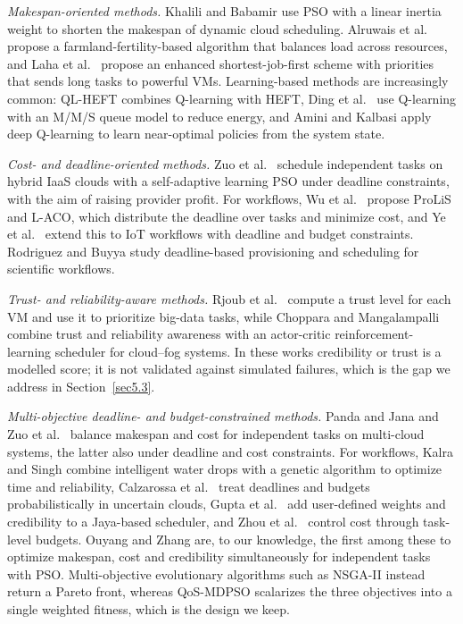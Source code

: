 \documentclass[pdflatex,sn-basic]{sn-jnl}
\theoremstyle{thmstyleone}%
\theoremstyle{thmstyletwo}%
\theoremstyle{thmstylethree}%
\begin{document}
\textit{Makespan-oriented methods.} Khalili and Babamir \citeyearpar{khalili2015} use PSO with a linear inertia weight to shorten the makespan of dynamic cloud scheduling. Alruwais et al.\ \citeyearpar{alruwais2024} propose a farmland-fertility-based algorithm that balances load across resources, and Laha et al.\ \citeyearpar{laha2024} propose an enhanced shortest-job-first scheme with priorities that sends long tasks to powerful VMs. Learning-based methods are increasingly common: QL-HEFT \citep{tong2020} combines Q-learning with HEFT, Ding et al.\ \citeyearpar{ding2020} use Q-learning with an M/M/S queue model to reduce energy, and Amini and Kalbasi \citeyearpar{amini2024} apply deep Q-learning to learn near-optimal policies from the system state.

\textit{Cost- and deadline-oriented methods.} Zuo et al.\ \citeyearpar{zuo2013} schedule independent tasks on hybrid IaaS clouds with a self-adaptive learning PSO under deadline constraints, with the aim of raising provider profit. For workflows, Wu et al.\ \citeyearpar{wu2017} propose ProLiS and L-ACO, which distribute the deadline over tasks and minimize cost, and Ye et al.\ \citeyearpar{ye2024} extend this to IoT workflows with deadline and budget constraints. Rodriguez and Buyya \citeyearpar{rodriguez2014} study deadline-based provisioning and scheduling for scientific workflows.

\textit{Trust- and reliability-aware methods.} Rjoub et al.\ \citeyearpar{rjoub2020} compute a trust level for each VM and use it to prioritize big-data tasks, while Choppara and Mangalampalli \citeyearpar{choppara2024} combine trust and reliability awareness with an actor-critic reinforcement-learning scheduler for cloud--fog systems. In these works credibility or trust is a modelled score; it is not validated against simulated failures, which is the gap we address in Section~\ref{sec5.3}.

\textit{Multi-objective deadline- and budget-constrained methods.} Panda and Jana \citeyearpar{panda2015} and Zuo et al.\ \citeyearpar{zuo2016} balance makespan and cost for independent tasks on multi-cloud systems, the latter also under deadline and cost constraints. For workflows, Kalra and Singh \citeyearpar{kalra2019} combine intelligent water drops with a genetic algorithm to optimize time and reliability, Calzarossa et al.\ \citeyearpar{calzarossa2021} treat deadlines and budgets probabilistically in uncertain clouds, Gupta et al.\ \citeyearpar{gupta2021} add user-defined weights and credibility to a Jaya-based scheduler, and Zhou et al.\ \citeyearpar{zhou2023} control cost through task-level budgets. Ouyang and Zhang \citeyearpar{ouyang2025} are, to our knowledge, the first among these to optimize makespan, cost and credibility simultaneously for independent tasks with PSO. Multi-objective evolutionary algorithms such as NSGA-II \citep{deb2002} instead return a Pareto front, whereas QoS-MDPSO scalarizes the three objectives into a single weighted fitness, which is the design we keep.
\end{document}
